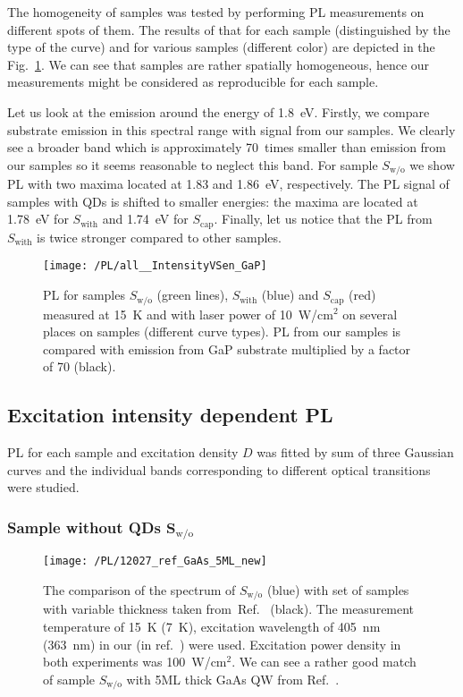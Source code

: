 The homogeneity of samples was tested by performing PL measurements on different spots of them. The results of that for each sample (distinguished by the type of the curve) and for various samples (different color) are depicted in the Fig.~\ref{fig:PL_homogenity}. We can see that samples are rather spatially homogeneous, hence our measurements might be considered as reproducible for each sample. %

Let us look at the emission around the energy of 1.8~eV. Firstly, we compare substrate emission in this spectral range with signal from our samples. We clearly see a broader band which is approximately 70~times smaller than emission from our samples so it seems reasonable to neglect this band. For sample $S_\mathrm{w/o}$ we show PL with two maxima located at 1.83 and 1.86~eV, respectively. The PL signal of samples with QDs is shifted to smaller energies: the maxima are located at 1.78~eV for $S_\mathrm{with}$ and 1.74~eV for $S_\mathrm{cap}$. Finally, let us notice that the PL from $S_\mathrm{with}$ is twice stronger compared to other samples.
\begin{figure}
	\centering
	\texttt{[image: /PL/all\_\_IntensityVSen\_GaP]}
	\caption{PL for samples $S_\mathrm{w/o}$ (green lines), $S_\mathrm{with}$ (blue) and $S_\mathrm{cap}$ (red) measured at 15~K and with laser power of 10~W/cm$^2$ on several places on samples (different curve types). PL from our samples is compared with emission from GaP substrate multiplied by a factor of 70 (black).}
	\label{fig:PL_homogenity}
\end{figure}

\subsection{Excitation intensity dependent PL}
\label{sec:intensity_PL_TU}
PL for each sample and excitation density $D$ was fitted by sum of three Gaussian curves and the individual bands corresponding to different optical transitions were studied. 

\subsubsection*{Sample without QDs $\mathbf{S_\mathrm{w/o}}$}
\label{Sec:PL_int_wo}
\begin{figure}
	\centering
	\texttt{[image: /PL/12027\_ref\_GaAs\_5ML\_new]}
	\caption{The comparison of the spectrum of $S_\mathrm{w/o}$ (blue) with set of samples with variable thickness taken from~Ref.~\citep{Prieto_APL1997} (black). The measurement temperature of 15~K (7~K), excitation wavelength of 405~nm (363~nm) in our (in ref.~\citep{Prieto_APL1997}) were used. Excitation power density in both experiments was 100~W/cm$^2$. We can see a rather good match of sample $S_\mathrm{w/o}$ with 5ML thick GaAs QW from Ref.~\citep{Prieto_APL1997}.}
	\label{fig:12027_ref}
\end{figure}


